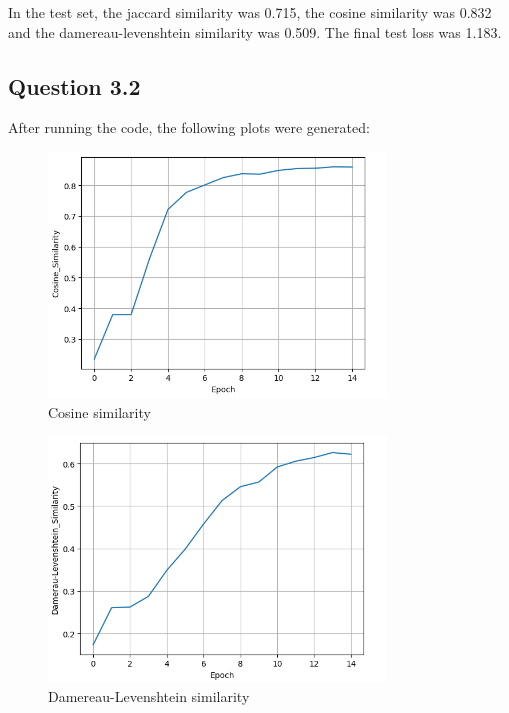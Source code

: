 \documentclass{article}
\begin{document}
In the test set, the jaccard similarity was 0.715, the cosine similarity was 0.832 and the damereau-levenshtein similarity was 0.509. The final test loss was 1.183.
\subsection{Question 3.2}
After running the code, the following plots were generated:

\begin{figure}[H]
    \centering
    \includegraphics[width=0.8\textwidth]{../report/plots/Transformer-cosine-similarity.png}
    \caption{Cosine similarity}
    \label{fig:transformer-cosine-similarity}
\end{figure}

\begin{figure}[H]
    \centering
    \includegraphics[width=0.8\textwidth]{../report/plots/Transformer-dl-similarity.png}
    \caption{Damereau-Levenshtein similarity}
    \label{fig:transformer-dl-similarity}
\end{figure}
\end{document}
